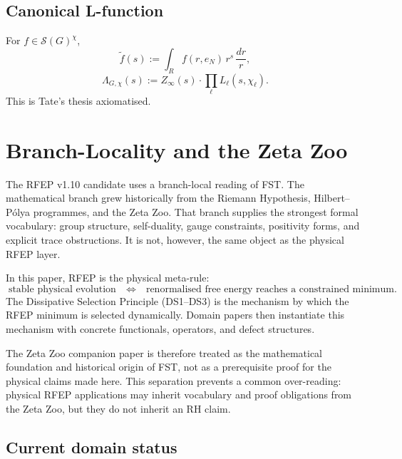 \documentclass[11pt,a4paper]{article}
\theoremstyle{plain}
\theoremstyle{definition}
\renewcommand{\S}{\mathcal{S}}
\newcommand{\chifn}{\chi}
\begin{document}
\subsection{Canonical L-function}

For $f \in \S(G)^\chifn$,
\[
  \tilde f(s) := \int_R f(r, e_N) \, r^s \, \frac{dr}{r},
\]
\[
  \Lambda_{G,\chifn}(s) := Z_\infty(s) \cdot \prod_\ell
    L_\ell(s, \chifn_\ell).
\]
This is Tate's thesis \cite{Tate1950} axiomatised.

\section{Branch-Locality and the Zeta Zoo}
\label{sec:branch-locality}

The RFEP v1.10 candidate uses a branch-local reading of FST.  The mathematical
branch grew historically from the Riemann Hypothesis, Hilbert--P\'olya
programmes, and the Zeta Zoo.  That branch supplies the strongest
formal vocabulary: group structure, self-duality, gauge constraints,
positivity forms, and explicit trace obstructions.  It is not,
however, the same object as the physical RFEP layer.

In this paper, RFEP is the physical meta-rule:
\[
  \text{stable physical evolution}
  \quad\Longleftrightarrow\quad
  \text{renormalised free energy reaches a constrained minimum.}
\]
The Dissipative Selection Principle (DS1--DS3) is the mechanism by
which the RFEP minimum is selected dynamically.  Domain papers then
instantiate this mechanism with concrete functionals, operators, and
defect structures.

The Zeta Zoo companion paper \cite{ZetaZooMaster} is therefore
treated as the mathematical foundation and historical origin of FST,
not as a prerequisite proof for the physical claims made here.  This
separation prevents a common over-reading: physical RFEP applications
may inherit vocabulary and proof obligations from the Zeta Zoo, but
they do not inherit an RH claim.

\subsection{Current domain status}
\end{document}
